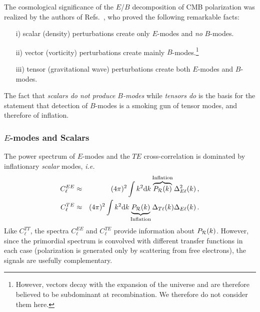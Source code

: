 \documentclass[12pt,letterpaper,rotate]{article}
\def\bea{\begin{eqnarray}}
\def\eea{\end{eqnarray}}
\def\d{{\rm d}}
\def\R{{\cal R}}
\begin{document}
{The cosmological significance of the $E$/$B$ decomposition of CMB polarization was realized by the authors of
Refs.~\cite{Kamionkowski:1996ks, Zaldarriaga:1996xe}, who proved the following remarkable facts:
\begin{enumerate}
\item[i)] scalar (density) perturbations create only $E$-modes and {\it no} $B$-modes.
\item[ii)] vector (vorticity) perturbations create mainly $B$-modes.\footnote{ However, vectors decay with the expansion of the universe and are therefore believed to be subdominant at recombination. We therefore do not consider them here.}
\item[iii)] tensor (gravitational wave) perturbations create both $E$-modes and $B$-modes.
\end{enumerate}

The fact that {\it scalars do not produce $B$-modes} while {\it tensors do} is the basis for the statement that
detection of $B$-modes is a smoking gun of tensor modes, and therefore of inflation.


\subsubsection{$E$-modes and Scalars}

The power spectrum of $E$-modes and the $TE$ cross-correlation is dominated by inflationary {\it scalar} modes, {\it i.e.}
\bea
C_\ell^{EE} &\approx& (4\pi)^2 \int k^2 \d k \overbrace{P_\R(k) }^{\rm Inflation} \Delta_{E \ell}^2(k) \, ,\\
C_\ell^{TE} &\approx& (4\pi)^2 \int k^2 \d k \underbrace{P_\R(k) }_{\rm Inflation} \Delta_{T\ell}(k) \Delta_{E \ell}(k)\, .
\eea
Like $C_\ell^{TT}$, the spectra $C_\ell^{EE}$ and $C_\ell^{TE}$ provide information about $P_\R(k)$.
However, since the primordial spectrum is convolved with different transfer functions in each case (polarization is generated only by scattering from free electrons), the signals are usefully complementary.

}
\end{document}
